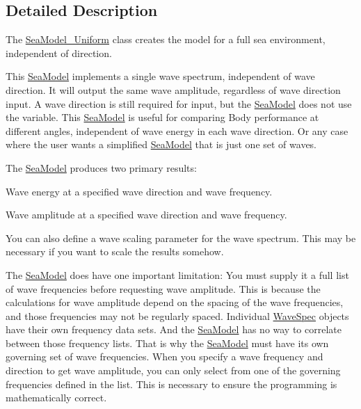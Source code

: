 \subsection{Detailed Description}
The \hyperlink{classosea_1_1_sea_model___uniform}{Sea\-Model\-\_\-\-Uniform} class creates the model for a full sea environment, independent of direction. 

This \hyperlink{classosea_1_1_sea_model}{Sea\-Model} implements a single wave spectrum, independent of wave direction. It will output the same wave amplitude, regardless of wave direction input. A wave direction is still required for input, but the \hyperlink{classosea_1_1_sea_model}{Sea\-Model} does not use the variable. This \hyperlink{classosea_1_1_sea_model}{Sea\-Model} is useful for comparing Body performance at different angles, independent of wave energy in each wave direction. Or any case where the user wants a simplified \hyperlink{classosea_1_1_sea_model}{Sea\-Model} that is just one set of waves.

The \hyperlink{classosea_1_1_sea_model}{Sea\-Model} produces two primary results\-:
\begin{DoxyEnumerate}
\item Wave energy at a specified wave direction and wave frequency.
\item Wave amplitude at a specified wave direction and wave frequency.
\end{DoxyEnumerate}

You can also define a wave scaling parameter for the wave spectrum. This may be necessary if you want to scale the results somehow.

The \hyperlink{classosea_1_1_sea_model}{Sea\-Model} does have one important limitation\-: You must supply it a full list of wave frequencies before requesting wave amplitude. This is because the calculations for wave amplitude depend on the spacing of the wave frequencies, and those frequencies may not be regularly spaced. Individual \hyperlink{classosea_1_1_wave_spec}{Wave\-Spec} objects have their own frequency data sets. And the \hyperlink{classosea_1_1_sea_model}{Sea\-Model} has no way to correlate between those frequency lists. That is why the \hyperlink{classosea_1_1_sea_model}{Sea\-Model} must have its own governing set of wave frequencies. When you specify a wave frequency and direction to get wave amplitude, you can only select from one of the governing frequencies defined in the list. This is necessary to ensure the programming is mathematically correct.

